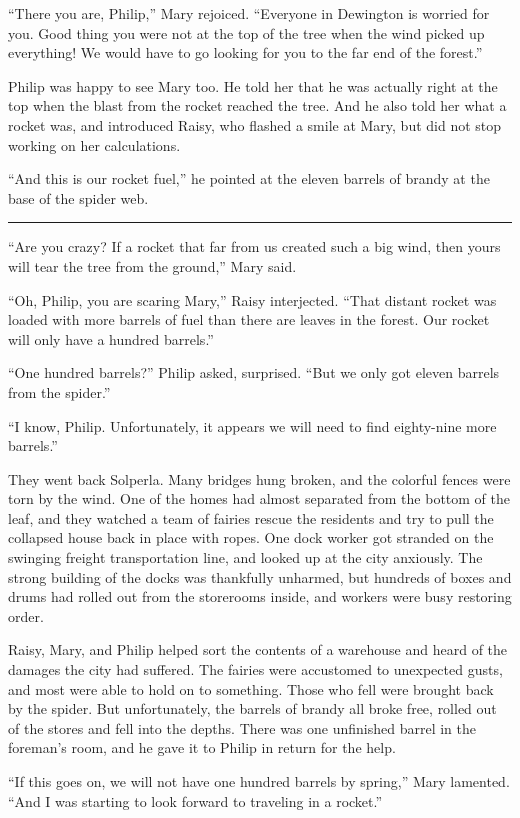 \documentclass[10pt, draft]{memoir}
\renewcommand{\pfbreakdisplay}{\bigskip \ding{166} \bigskip}
\newcommand{\secbreak}{\fancybreak{\pfbreakdisplay}}
\begin{document}
``There you are, Philip,'' Mary rejoiced. ``Everyone in Dewington is worried
for you. Good thing you were not at the top of the tree when the wind picked up
everything! We would have to go looking for you to the far end of the forest.''

Philip was happy to see Mary too. He told her that he was actually right at the
top when the blast from the rocket reached the tree. And he also told her what
a rocket was, and introduced Raisy, who flashed a smile at Mary, but did not
stop working on her calculations.

``And this is our rocket fuel,'' he pointed at the eleven barrels of brandy at
the base of the spider web.

\secbreak

``Are you crazy? If a rocket that far from us created such a big wind, then
yours will tear the tree from the ground,'' Mary said.

``Oh, Philip, you are scaring Mary,'' Raisy interjected. ``That distant rocket
was loaded with more barrels of fuel than there are leaves in the forest. Our
rocket will only have a hundred barrels.''

``One hundred barrels?'' Philip asked, surprised. ``But we only got eleven
barrels from the spider.''

``I know, Philip. Unfortunately, it appears we will need to find eighty-nine
more barrels.''

They went back Solperla. Many bridges hung broken, and the colorful fences were
torn by the wind. One of the homes had almost separated from the bottom of the
leaf, and they watched a team of fairies rescue the residents and try to pull
the collapsed house back in place with ropes. One dock worker got stranded on
the swinging freight transportation line, and looked up at the city anxiously.
The strong building of the docks was thankfully unharmed, but hundreds of boxes
and drums had rolled out from the storerooms inside, and workers were busy
restoring order.

Raisy, Mary, and Philip helped sort the contents of a warehouse and heard of
the damages the city had suffered. The fairies were accustomed to unexpected
gusts, and most were able to hold on to something. Those who fell were brought
back by the spider. But unfortunately, the barrels of brandy all broke free,
rolled out of the stores and fell into the depths. There was one unfinished
barrel in the foreman's room, and he gave it to Philip in return for the help.

``If this goes on, we will not have one hundred barrels by spring,'' Mary
lamented. ``And I was starting to look forward to traveling in a rocket.''
\end{document}
